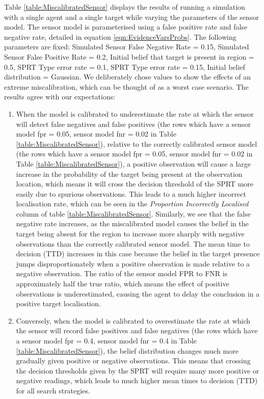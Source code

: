 Table \ref{table:MiscalibratedSensor} displays the results of running a simulation with a single agent and a single target while varying the parameters of the sensor model. The sensor model is parameterised using a false positive rate and false negative rate, detailed in equation \ref{eqn:EvidenceVarsProbs}. The following parameters are fixed: Simulated Sensor False Negative Rate = 0.15, Simulated Sensor False Positive Rate = 0.2, Initial belief that target is present in region = 0.5, SPRT Type  error rate = 0.1, SPRT Type  error rate = 0.15, Initial belief distribution = Gaussian. We deliberately chose values to show the effects of an extreme miscalibration, which can be thought of as a worst case scenario. The results agree with our expectations: 
\begin{enumerate}
    \item When the model is calibrated to underestimate the rate at which the sensor will detect false negatives and false positives (the rows which have a sensor model fpr = 0.05, sensor model fnr = 0.02 in Table \ref{table:MiscalibratedSensor}), relative to the correctly calibrated sensor model (the rows which have a sensor model fpr = 0.05, sensor model fnr = 0.02 in Table \ref{table:MiscalibratedSensor}), a positive observation will cause a large increase in the probability of the target being present at the observation location, which means it will cross the decision threshold of the SPRT more easily due to spurious observations. This leads to a much higher incorrect localisation rate, which can be seen in the \textit{Proportion Incorrectly Localised} column of table \ref{table:MiscalibratedSensor}. Similarly, we see that the false negative rate increases, as the miscalibrated model causes the belief in the target being absent for the region to increase more sharply with negative observations than the correctly calibrated sensor model. The mean time to decision (TTD) increases in this case because the belief in the target presence jumps disproportionately when a positive observation is made relative to a negative observation. The ratio of the sensor model FPR to FNR is approximately half the true ratio, which means the effect of positive observations is underestimated, causing the agent to delay the conclusion in a positive target localisation.
    \item Conversely, when the model is calibrated to overestimate the rate at which the sensor will record false positives and false negatives (the rows which have a sensor model fpr = 0.4, sensor model fnr = 0.4 in Table \ref{table:MiscalibratedSensor}), the belief distribution changes much more gradually given positive or negative observations. This means that crossing the decision thresholds given by the SPRT will require many more positive or negative readings, which leads to much higher mean times to decision (TTD) for all search strategies.
\end{enumerate}